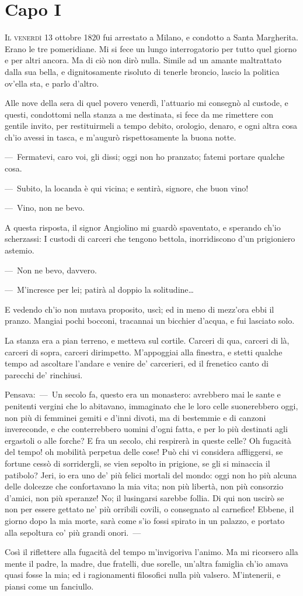 
\chapter{Capo I}


\lettrine{I}{l venerdì} 13 ottobre 1820 fui arrestato a Milano, e condotto a Santa
Margherita. Erano le tre pomeridiane. Mi si fece un lungo interrogatorio
per tutto quel giorno e per altri ancora. Ma di ciò non dirò nulla. Simile
ad un amante maltrattato dalla sua bella, e dignitosamente risoluto di
tenerle broncio, lascio la politica ov'ella sta, e parlo d'altro.

Alle nove della sera di quel povero venerdì, l'attuario mi consegnò al
custode, e questi, condottomi nella stanza a me destinata, si fece da me
rimettere con gentile invito, per restituirmeli a tempo debito, orologio,
denaro, e ogni altra cosa ch'io avessi in tasca, e m'augurò rispettosamente
la buona notte.

---~Fermatevi, caro voi, gli dissi; oggi non ho pranzato; fatemi portare
qualche cosa.

---~Subito, la locanda è qui vicina; e sentirà, signore, che buon vino!

---~Vino, non ne bevo.

A questa risposta, il signor Angiolino mi guardò spaventato, e sperando
ch'io scherzassi: I custodi di carceri che tengono bettola, inorridiscono
d'un prigioniero astemio.

---~Non ne bevo, davvero.

---~M'incresce per lei; patirà al doppio la solitudine\dots{}

E vedendo ch'io non mutava proposito, uscì; ed in meno di mezz'ora ebbi il
pranzo. Mangiai pochi bocconi, tracannai un bicchier d'acqua, e fui
lasciato solo.

La stanza era a pian terreno, e metteva sul cortile. Carceri di qua,
carceri di là, carceri di sopra, carceri dirimpetto. M'appoggiai alla
finestra, e stetti qualche tempo ad ascoltare l'andare e venire de'
carcerieri, ed il frenetico canto di parecchi de' rinchiusi.

Pensava:~---~Un secolo fa, questo era un monastero: avrebbero mai le sante e
penitenti vergini che lo abitavano, immaginato che le loro celle
suonerebbero oggi, non più di femminei gemiti e d'inni divoti, ma di
bestemmie e di canzoni invereconde, e che conterrebbero uomini d'ogni
fatta, e per lo più destinati agli ergastoli o alle forche? E fra un
secolo, chi respirerà in queste celle? Oh fugacità del tempo! oh mobilità
perpetua delle cose! Può chi vi considera affliggersi, se fortune cessò di
sorridergli, se vien sepolto in prigione, se gli si minaccia il patibolo?
Jeri, io era uno de' più felici mortali del mondo: oggi non ho più alcuna
delle dolcezze che confortavano la mia vita; non più libertà, non più
consorzio d'amici, non più speranze! No; il lusingarsi sarebbe follia. Di
qui non uscirò se non per essere gettato ne' più orribili covili, o
consegnato al carnefice! Ebbene, il giorno dopo la mia morte, sarà come
s'io fossi spirato in un palazzo, e portato alla sepoltura co' più grandi
onori.~---

Così il riflettere alla fugacità del tempo m'invigoriva l'animo. Ma mi
ricorsero alla mente il padre, la madre, due fratelli, due sorelle,
un'altra famiglia ch'io amava quasi fosse la mia; ed i ragionamenti
filosofici nulla più valsero. M'intenerii, e piansi come un fanciullo.
